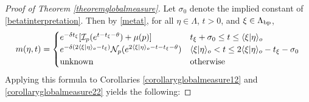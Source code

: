 \begin{proof}[Proof of Theorem \ref{theoremglobalmeasure}]
Let $\sigma_0$ denote the implied constant of \eqref{betatinterpretation}. Then by \eqref{metat}, for all $\eta\in\Lambda$, $t > 0$, and $\xi\in\Lambda_{\mathrm{bp}}$,
\begin{equation}
\label{metatsimple}
m(\eta,t) = \begin{cases}
e^{-\delta t_\xi} [\mathcal I_p(e^{t - t_\xi - \theta}) + \mu(p)] & t_\xi + \sigma_0 \leq t \leq \langle \xi|\eta\rangle_o\\
e^{-\delta (2\langle \xi|\eta\rangle_o - t_\xi)} \mathcal N_p(e^{2\langle \xi|\eta\rangle_o - t - t_\xi - \theta}) & \langle \xi|\eta\rangle_o < t \leq 2\langle \xi|\eta\rangle_o - t_\xi - \sigma_0\\
\textup{unknown} & \textup{otherwise}
\end{cases}
\end{equation}
Applying this formula to Corollaries \ref{corollaryglobalmeasure12} and \ref{corollaryglobalmeasure22} yields the following:


\end{proof}

